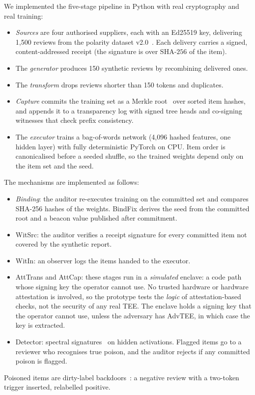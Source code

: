 We implemented the five-stage pipeline in Python with real cryptography and real training:
\begin{itemize}
\item \emph{Sources} are four authorised suppliers, each with an Ed25519 key, delivering
  1,500 reviews from the polarity dataset v2.0~\cite{pang2004sentimental}. Each delivery
  carries a signed, content-addressed receipt (the signature is over
  $\mathrm{SHA\text{-}256}$ of the item).
\item The \emph{generator} produces 150 synthetic reviews by recombining delivered ones.
\item The \emph{transform} drops reviews shorter than 150 tokens and duplicates.
\item \emph{Capture} commits the training set as a Merkle root~\cite{merkle1988signature} over sorted item hashes, and
  appends it to a transparency log with signed tree heads and co-signing witnesses that
  check prefix consistency.
\item The \emph{executor} trains a bag-of-words network (4,096 hashed features, one hidden
  layer) with fully deterministic PyTorch on CPU. Item order is canonicalised before a
  seeded shuffle, so the trained weights depend only on the item set and the seed.
\end{itemize}
The mechanisms are implemented as follows:
\begin{itemize}
\item \emph{Binding}: the auditor re-executes training on the committed set and compares
  SHA-256 hashes of the weights. \textsf{BindFix} derives the seed from the committed root
  and a beacon value published after commitment.
\item \textsf{WitSrc}: the auditor verifies a receipt signature for every committed item not
  covered by the synthetic report.
\item \textsf{WitIn}: an observer logs the items handed to the executor.
\item \textsf{AttTrans} and \textsf{AttCap}: these stages run in a \emph{simulated} enclave: a code path whose signing key the operator cannot use. No trusted hardware or hardware attestation is involved, so the prototype tests the \emph{logic} of attestation-based checks, not the security of any real TEE.
  The enclave holds a signing key that the operator cannot use, unless the adversary has
  \textsf{AdvTEE}, in which case the key is extracted.
\item \textsf{Detector}: spectral signatures~\cite{tran2018spectral} on hidden activations.
  Flagged items go to a reviewer who recognises true poison, and the auditor rejects if any
  committed poison is flagged.
\end{itemize}
Poisoned items are dirty-label backdoors~\cite{gu2019badnets}: a negative review with a
two-token trigger inserted, relabelled positive.

